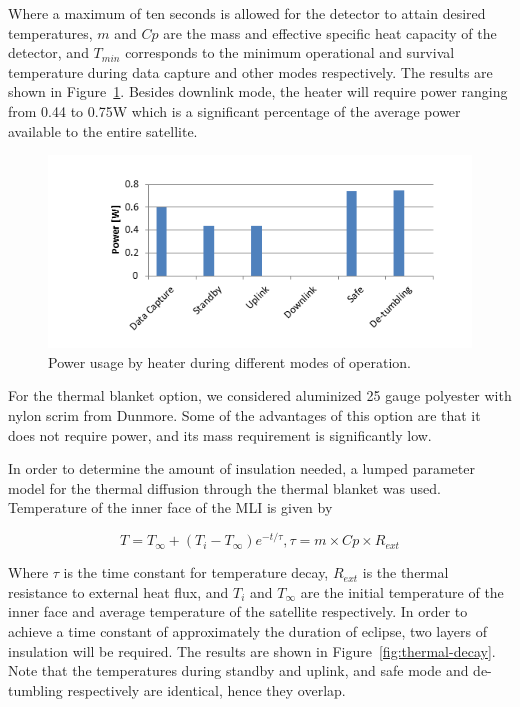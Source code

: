 \documentclass[12pt]{article}
\begin{document}
Where a maximum of ten seconds is allowed for the detector to attain desired temperatures, $m$ and $Cp$ are the mass and effective specific heat capacity of the detector, and $T_{min}$ corresponds to the minimum operational and survival temperature during data capture and other modes respectively. The results are shown in Figure~\ref{fig:thermal-power-usage}. Besides downlink mode, the heater will require power ranging from 0.44 to 0.75W which is a significant percentage of the average power available to the entire satellite.

\begin{figure}[ht]%
\centering
\includegraphics{images/thermal-power-usage}
\caption{Power usage by heater during different modes of operation.}%
\label{fig:thermal-power-usage}%
\end{figure}

For the thermal blanket option, we considered aluminized 25 gauge polyester with nylon scrim from Dunmore.\cite{dunmore} Some of the advantages of this option are that it does not require power, and its mass requirement is significantly low.

In order to determine the amount of insulation needed, a lumped parameter model for the thermal diffusion through the thermal blanket was used. Temperature of the inner face of the MLI is given by

\begin{equation}
T = T_\infty + (T_i- T_\infty)e^{-t/\tau}, \tau = m \times Cp \times R_{ext}
\label{eq:thermal-inner-MLI}
\end{equation}

Where $\tau$ is the time constant for temperature decay, $R_{ext}$ is the thermal resistance to external heat flux, and $T_i$ and $T_\infty$ are the initial temperature of the inner face and average temperature of the satellite respectively. In order to achieve a time constant of approximately the duration of eclipse, two layers of insulation will be required. The results are shown in Figure~\ref{fig:thermal-decay}.  Note that the temperatures during standby and uplink, and safe mode and de-tumbling respectively are identical, hence they overlap.
\end{document}
